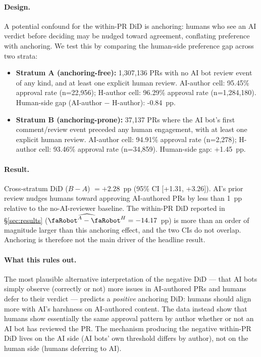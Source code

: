 
\paragraph{Design.} A potential confound for the within-PR DiD is anchoring: humans who see an AI verdict before deciding may be nudged toward agreement, conflating preference with anchoring. We test this by comparing the human-side preference gap across two strata:

\begin{itemize}
\item \textbf{Stratum A (anchoring-free):} 1,307,136{} PRs with no AI bot review event of any kind, and at least one explicit human review. AI-author cell: 95.45\%{} approval rate (n=22,956{}); H-author cell: 96.29\%{} approval rate (n=1,284,180{}). Human-side gap (AI-author $-$ H-author): -0.84{}~pp.
\item \textbf{Stratum B (anchoring-prone):} 37,137{} PRs where the AI bot's first comment/review event preceded any human engagement, with at least one explicit human review. AI-author cell: 94.91\%{} approval rate (n=2,278{}); H-author cell: 93.46\%{} approval rate (n=34,859{}). Human-side gap: +1.45{}~pp.
\end{itemize}

\paragraph{Result.} Cross-stratum DiD ($B - A$) $= +2.28{}$~pp (95\% CI [+1.31, +3.26]{}). AI's prior review nudges humans toward approving AI-authored PRs by less than 1~pp relative to the no-AI-reviewer baseline. The within-PR DiD reported in \S\ref{sec:results} ($\widehat{\rbt^A - \rbt^H} = -14.17{}$~pp) is more than an order of magnitude larger than this anchoring effect, and the two CIs do not overlap. Anchoring is therefore not the main driver of the headline result.

\paragraph{What this rules out.} The most plausible alternative interpretation of the negative DiD --- that AI bots simply observe (correctly or not) more issues in AI-authored PRs and humans defer to their verdict --- predicts a \emph{positive} anchoring DiD: humans should align more with AI's harshness on AI-authored content. The data instead show that humans show essentially the same approval pattern by author whether or not an AI bot has reviewed the PR. The mechanism producing the negative within-PR DiD lives on the AI side (AI bots' own threshold differs by author), not on the human side (humans deferring to AI).

